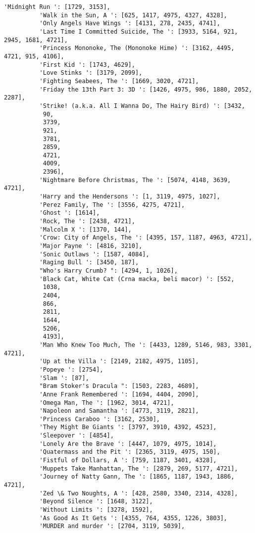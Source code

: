 \documentclass[11pt]{article}
\begin{document}
\begin{Verbatim}[commandchars=\\\{\}]
          'Midnight Run ': [1729, 3153],
          'Walk in the Sun, A ': [625, 1417, 4975, 4327, 4328],
          'Only Angels Have Wings ': [4131, 278, 2435, 4741],
          'Last Time I Committed Suicide, The ': [3933, 5164, 921, 2945, 1681, 4721],
          'Princess Mononoke, The (Mononoke Hime) ': [3162, 4495, 4721, 915, 4106],
          'First Kid ': [1743, 4629],
          'Love Stinks ': [3179, 2099],
          'Fighting Seabees, The ': [1669, 3020, 4721],
          'Friday the 13th Part 3: 3D ': [1426, 4975, 986, 1880, 2052, 2287],
          'Strike! (a.k.a. All I Wanna Do, The Hairy Bird) ': [3432,
           90,
           3739,
           921,
           3781,
           2859,
           4721,
           4009,
           2396],
          'Nightmare Before Christmas, The ': [5074, 4148, 3639, 4721],
          'Harry and the Hendersons ': [1, 3119, 4975, 1027],
          'Perez Family, The ': [3556, 4275, 4721],
          'Ghost ': [1614],
          'Rock, The ': [2438, 4721],
          'Malcolm X ': [1370, 144],
          'Crow: City of Angels, The ': [4395, 157, 1187, 4963, 4721],
          'Major Payne ': [4816, 3210],
          'Sonic Outlaws ': [1587, 4084],
          'Raging Bull ': [3450, 187],
          "Who's Harry Crumb? ": [4294, 1, 1026],
          'Black Cat, White Cat (Crna macka, beli macor) ': [552,
           1038,
           2404,
           866,
           2811,
           1644,
           5206,
           4193],
          'Man Who Knew Too Much, The ': [4433, 1289, 5146, 983, 3301, 4721],
          'Up at the Villa ': [2149, 2182, 4975, 1105],
          'Popeye ': [2754],
          'Slam ': [87],
          "Bram Stoker's Dracula ": [1503, 2283, 4689],
          'Anne Frank Remembered ': [1694, 4404, 2090],
          'Omega Man, The ': [1962, 3014, 4721],
          'Napoleon and Samantha ': [4773, 3119, 2821],
          'Princess Caraboo ': [3162, 2530],
          'They Might Be Giants ': [3797, 3910, 4392, 4523],
          'Sleepover ': [4854],
          'Lonely Are the Brave ': [4447, 1079, 4975, 1014],
          'Quatermass and the Pit ': [2365, 3119, 4975, 150],
          'Fistful of Dollars, A ': [759, 1187, 3401, 4328],
          'Muppets Take Manhattan, The ': [2879, 269, 5177, 4721],
          'Journey of Natty Gann, The ': [1865, 1187, 1943, 1886, 4721],
          'Zed \& Two Noughts, A ': [428, 2580, 3340, 2314, 4328],
          'Beyond Silence ': [1648, 3122],
          'Without Limits ': [3278, 1592],
          'As Good As It Gets ': [4355, 764, 4355, 1226, 3803],
          'MURDER and murder ': [2704, 3119, 5039],

\end{Verbatim}
\end{document}
